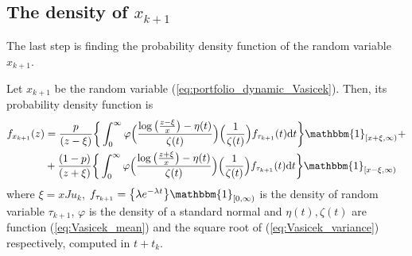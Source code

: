 \subsection{The density of $x_{k+1}$}
The last step is finding the probability density function of the random variable $x_{k+1}$. 
\begin{proposition}
	Let $x_{k+1}$ be the random variable (\ref{eq:portfolio_dynamic_Vasicek}). Then, its probability density function is
	\begin{align*}
	f_{x_{k+1}}(z) &=\frac{p}{(z-\xi)}\bigg\{ \int_{0}^{\infty}\varphi\Big(\frac{\log\big(\frac{z-\xi}{x}\big)-\eta(t)}{\zeta(t)}\Big)\Big(\frac{1}{\zeta(t)}\Big)f_{\tau_{k+1}}(t)\mathrm{d}t\bigg\}\mathbbm{1}_{[x+\xi,\infty)} \nonumber +\\
	& + \frac{(1-p)}{(z+\xi)}\bigg\{ \int_{0}^{\infty}\varphi\Big(\frac{\log\big(\frac{z+\xi}{x}\big)-\eta(t)}{\zeta(t)}\Big)\Big(\frac{1}{\zeta(t)}\Big)f_{\tau_{k+1}}(t)\mathrm{d}t\bigg\}\mathbbm{1}_{[x-\xi,\infty)}
	\end{align*}
	where $\xi=xJu_k$, $f_{\tau_{k+1}}= \big\{\lambda e^{-\lambda t}\big\}\mathbbm{1}_{[0,\infty)}$ is the density of random variable $\tau_{k+1}$, $\varphi$ is the density of a standard normal and $\eta(t),\zeta(t)$ are function (\ref{eq:Vasicek_mean}) and the square root of (\ref{eq:Vasicek_variance}) respectively, computed in $t+t_k$.
\end{proposition}
